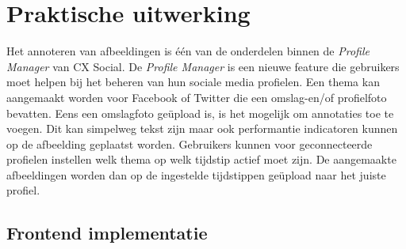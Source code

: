
\chapter{Praktische uitwerking}
\vspace{-3cm}
Het annoteren van afbeeldingen is \'{e}\'{e}n van de onderdelen binnen de \textit{Profile Manager} van CX Social. De \textit{Profile Manager} is een nieuwe feature die gebruikers moet helpen bij het beheren van hun sociale media profielen. Een thema kan aangemaakt worden voor Facebook of Twitter die een omslag-en/of profielfoto bevatten. Eens een omslagfoto ge\"{u}pload is, is het mogelijk om annotaties toe te voegen. Dit kan simpelweg tekst zijn maar ook performantie indicatoren kunnen op de afbeelding geplaatst worden. Gebruikers kunnen voor geconnecteerde profielen instellen welk thema op welk tijdstip actief moet zijn. De aangemaakte afbeeldingen worden dan op de ingestelde tijdstippen ge\"{u}pload naar het juiste profiel. 


\section{Frontend implementatie}
